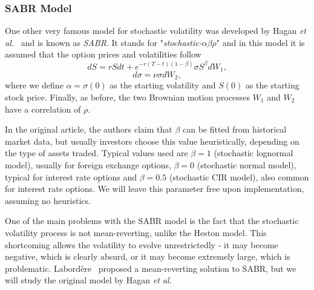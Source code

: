 \subsubsection{SABR Model}
One other very famous model for stochastic volatility was developed by Hagan \textit{et al.}~\cite{Hagan} and is known as \emph{SABR}. It stands for "\emph{stochastic-}$\alpha\beta\rho$" and in this model it is assumed that the option prices and volatilities follow~\cite{Geeske}
\begin{equation}\label{dF}
dS=rSdt+e^{-r(T-t)(1-\beta)}\sigma S^\beta dW_1,
\end{equation}
\begin{equation}\label{dsigma}
d\sigma=\nu\sigma dW_2,
\end{equation}
\noindent where we define $\alpha=\sigma(0)$ as the starting volatility and $S(0)$ as the starting stock price. Finally, as before, the two Brownian motion processes $W_1$ and $W_2$ have a correlation of $\rho$.

\iffalse
It should be noted that we are now using the \hl{forward measure}, so in eq.\eqref{dF} we use $F$, the \emph{forward price}, instead of the usual spot price $S$ from eq.  \ref{GBM}. These two quantities are related by $S(t)=e^{-r(T-t)}F(t)$, so we can easily obtain one from the other.
\fi



In the original article, the authors claim that $\beta$ can be fitted from historical market data, but usually investors choose this value heuristically, depending on the type of assets traded. Typical values used are $\beta=1$ (stochastic lognormal model), usually for foreign exchange options, $\beta=0$ (stochastic normal model), typical for interest rate options and $\beta=0.5$ (stochastic CIR model), also common for interest rate options.
We will leave this parameter free upon implementation, assuming no heuristics.

One of the main problems with the SABR model is the fact that the stochastic volatility process is not mean-reverting, unlike the Heston model. This shortcoming allows the volatility to evolve unrestrictedly - it may become negative, which is clearly absurd, or it may become extremely large, which is problematic. Labordère~\cite{Labordere} proposed a mean-reverting solution to SABR, but we will study the original model by Hagan \textit{et al.}

